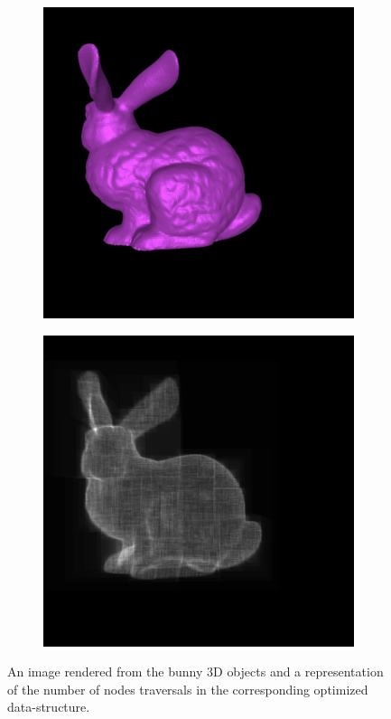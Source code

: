 \documentclass[acmsmall]{acmart}
\begin{document}
\begin{figure}[h]
    \centering
    
\begin{subfigure}{.5\textwidth}
  \centering
  \includegraphics[width=.9\linewidth]{img/bunny.png}
\end{subfigure}%
\begin{subfigure}{.5\textwidth}
  \centering
  \includegraphics[width=.9\linewidth]{img/tbbunny.png}
\end{subfigure}    
    
    \caption{An image rendered from the bunny 3D objects and a representation of the number of nodes traversals in the corresponding optimized data-structure.}
    \label{fig:dsbunny}
\end{figure}
\end{document}
